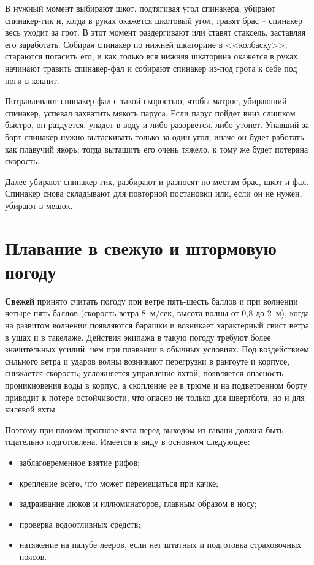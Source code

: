 \documentclass[a4paper, 12pt, twoside, final]{scrbook}
\begin{document}
В нужный момент выбирают шкот, подтягивая угол спинакера, убирают спинакер-гик и, когда в руках окажется шкотовый угол, травят брас \--- спинакер весь уходит за грот. В этот момент раздергивают или ставят стаксель, заставляя его заработать. Собирая спинакер по нижней шкаторине в <<колбаску>>, стараются погасить его, и как только вся нижняя шкаторина окажется в руках, начинают травить спинакер-фал и собирают спинакер из-под грота к себе под ноги в кокпит.

Потравливают спинакер-фал с такой скоростью, чтобы матрос, убирающий спинакер, успевал захватить мякоть паруса. Если парус пойдет вниз слишком быстро, он раздуется, упадет в воду и либо разорвется, либо утонет. Упавший за борт спинакер нужно вытаскивать только за один угол, иначе он будет работать как плавучий якорь; тогда вытащить его очень тяжело, к тому же будет потеряна скорость.

Далее убирают спинакер-гик, разбирают и разносят по местам брас, шкот и фал. Спинакер снова складывают для повторной постановки или, если он не нужен, убирают в мешок. 

\section{Плавание в свежую и штормовую погоду}

\textbf{Свежей} принято считать погоду при ветре пять-шесть баллов и при волнении четыре-пять баллов (скорость ветра 8~м/сек, высота волны от 0,8 до 2~м), когда на развитом волнении появляются барашки и возникает характерный свист ветра в ушах и в такелаже. Действия экипажа в такую погоду требуют более значительных усилий, чем при плавании в обычных условиях. Под воздействием сильного ветра и ударов волны возникают перегрузки в рангоуте и корпусе, снижается скорость; усложняется управление яхтой; появляется опасность проникновения воды в корпус, а скопление ее в трюме и на подветренном борту приводит к потере остойчивости, что опасно не только для швертбота, но и для килевой яхты.

Поэтому при плохом прогнозе яхта перед выходом из гавани должна быть тщательно подготовлена. Имеется в виду в основном следующее:

\begin{itemize}
\item заблаговременное взятие рифов;
\item крепление всего, что может перемещаться при качке;
\item задраивание люков и иллюминаторов, главным образом в носу;
\item проверка водоотливных средств;
\item натяжение на палубе лееров, если нет штатных и подготовка страховочных поясов.
\end{itemize}
\end{document}
